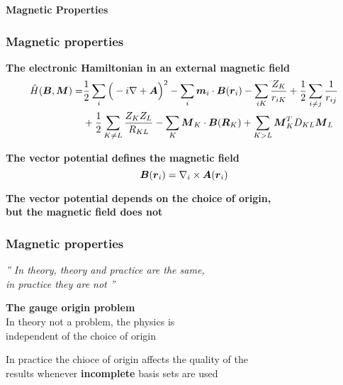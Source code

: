 \begin{frame}
    \centering
    \textbf{\Large{Magnetic Properties}}
\end{frame}

\begin{frame}
    \frametitle{Magnetic properties}
    \centering
    \textbf{The electronic Hamiltonian in an external magnetic field}
    \begin{align}
        \nonumber
        \hat{H}(\boldsymbol B,\boldsymbol M) =& \frac{1}{2}\sum_i\Big(-i\nabla + \boldsymbol A\Big)^2
        -\sum_i\boldsymbol m_i\cdot\boldsymbol B(\boldsymbol r_i) - \sum_{iK}\frac{Z_K}{r_{iK}}
        +\frac{1}{2}\sum_{i \neq j}\frac{1}{r_{ij}}\\
        \nonumber
        & + \frac{1}{2}\sum_{K \neq L}
        \frac{Z_K Z_L}{R_{KL}} - \sum_K\boldsymbol M_K\cdot\boldsymbol B(\boldsymbol R_K) +
        \sum_{K>L}\boldsymbol M_K^TD_{KL}\boldsymbol M_L
    \end{align}

    \vspace{10mm}

    \pause
    \textbf{The vector potential defines the magnetic field}
    \begin{equation}
        \nonumber
        \boldsymbol B(\boldsymbol r_i) = \nabla_i \times \boldsymbol A(\boldsymbol r_i)
    \end{equation}

    \vspace{10mm}

    \pause
    \textbf{The vector potential depends on the choice of origin,\\
    but the magnetic field does not}
\end{frame}

\begin{frame}
    \frametitle{Magnetic properties}
    \begin{exampleblock}{{
        \begin{center}
        \it{''
        In theory, theory and practice are the same,\\
        in practice they are not
        ''}
        \end{center}
        }}
	\vskip2mm
	\hspace*{}
    \end{exampleblock}

    \pause
    \vspace{10mm}

    \centering
    \textbf{The gauge origin problem}\\
    In theory not a problem, the physics is\\
    independent of the choice of origin\\

    \vspace{5mm}

    In practice the chioce of origin affects the quality of the\\
    results whenever \textbf{incomplete} basis sets are used
\end{frame}

